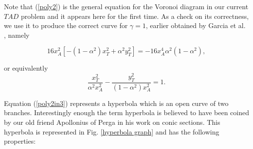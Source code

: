 Note that (\ref{poly2}) is the general equation for the Voronoi diagram in our current $TAD$ problem and it appears here for the first time. As a check on its correctness, we use it to produce the correct curve for $\gamma=1$, earlier obtained by Garcia et al. \cite{garcia2015escape}, namely
 
\begin{equation}
16 x_{A}^{2}[-(1-\alpha^{2})x_{T}^{2}+\alpha^{2} y_{T}^{2}]
=-16 x_{A}^{4}\alpha^2 (1-\alpha^{2}),
\label{poly2in3}
\end{equation}

or equivalently
\begin{equation}
\dfrac{x_{T}^{2}}{\alpha^{2}x_{A}^{2}}
- \dfrac{y_{T}^{2}}{(1-\alpha^{2})x_{A}^{2}}=1.
\label{hyperbola}
\end{equation}

Equation (\ref{poly2in3}) represents a hyperbola which is an open curve of two branches. Interestingly enough the term hyperbola is believed  to have been coined by our old friend Apollonius of Perga in his work on conic sections. This hyperbola is represented in Fig. \ref{hyperbola graph} and has the following properties:

